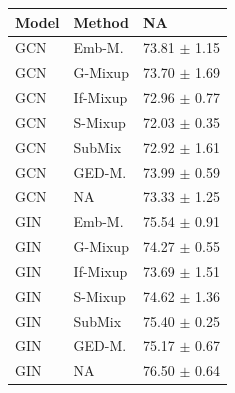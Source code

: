 \begin{table}
\centering
\begin{tabular}{lll}
\toprule
\textbf{Model} & \textbf{Method} & \textbf{NA}\\
\midrule
GCN & Emb-M. & 73.81 $\pm$ 1.15\\
GCN & G-Mixup & 73.70 $\pm$ 1.69\\
GCN & If-Mixup & 72.96 $\pm$ 0.77\\
GCN & S-Mixup & 72.03 $\pm$ 0.35\\
GCN & SubMix & 72.92 $\pm$ 1.61\\
GCN & GED-M. & 73.99 $\pm$ 0.59\\
GCN & NA & 73.33 $\pm$ 1.25\\
GIN & Emb-M. & 75.54 $\pm$ 0.91\\
GIN & G-Mixup & 74.27 $\pm$ 0.55\\
GIN & If-Mixup & 73.69 $\pm$ 1.51\\
GIN & S-Mixup & 74.62 $\pm$ 1.36\\
GIN & SubMix & 75.40 $\pm$ 0.25\\
GIN & GED-M. & 75.17 $\pm$ 0.67\\
GIN & NA & 76.50 $\pm$ 0.64\\
\bottomrule
\end{tabular}
\end{table}
